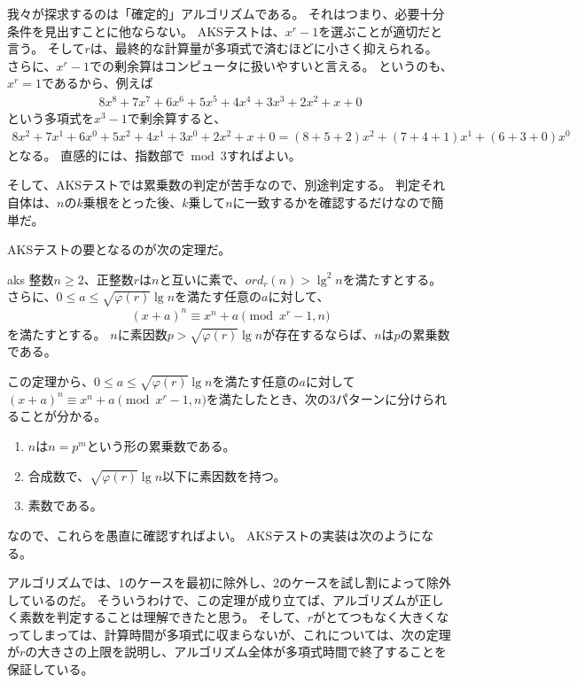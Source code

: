 我々が探求するのは「確定的」アルゴリズムである。
それはつまり、必要十分条件を見出すことに他ならない。
AKSテストは、$x^r-1$を選ぶことが適切だと言う。
そして$r$は、最終的な計算量が多項式で済むほどに小さく抑えられる。
さらに、$x^r-1$での剰余算はコンピュータに扱いやすいと言える。
というのも、$x^r=1$であるから、例えば
\begin{align*}
8x^8 + 7x^7 + 6x^6 + 5x^5 + 4x^4 + 3x^3 + 2x^2 + x + 0
\end{align*}
という多項式を$x^3-1$で剰余算すると、
\begin{align*}
8x^2 + 7x^1 + 6x^0 + 5x^2 + 4x^1 + 3x^0 + 2x^2 + x + 0 = (8 + 5 + 2)x^2 + (7 + 4 + 1)x^1 + (6 + 3 + 0)x^0
\end{align*}
となる。
直感的には、指数部で$\bmod{3}$すればよい。

そして、AKSテストでは累乗数の判定が苦手なので、別途判定する。
判定それ自体は、$n$の$k$乗根をとった後、$k$乗して$n$に一致するかを確認するだけなので簡単だ。

AKSテストの要となるのが次の定理だ。

\begin{Theo}{}{aks}
整数$n\ge2$、正整数$r$は$n$と互いに素で、$ord_r(n)>\lg^2{n}$を満たすとする。
さらに、$0\le a \le\sqrt{\varphi(r)}\lg{n}$を満たす任意の$a$に対して、
\begin{align*}
(x+a)^n \equiv x^n + a \pmod{x^r-1, n}
\end{align*}
を満たすとする。
$n$に素因数$p>\sqrt{\varphi(r)}\lg{n}$が存在するならば、$n$は$p$の累乗数である。
\end{Theo}

この定理から、$0\le a \le\sqrt{\varphi(r)}\lg{n}$を満たす任意の$a$に対して$(x+a)^n \equiv x^n + a \pmod{x^r-1, n}$を満たしたとき、次の3パターンに分けられることが分かる。
\begin{enumerate}
 \item $n$は$n=p^m$という形の累乗数である。
 \item 合成数で、$\sqrt{\varphi(r)}\lg{n}$以下に素因数を持つ。
 \item 素数である。
\end{enumerate}

なので、これらを愚直に確認すればよい。
AKSテストの実装は次のようになる。


アルゴリズムでは、1のケースを最初に除外し、2のケースを試し割によって除外しているのだ。
そういうわけで、この定理が成り立てば、アルゴリズムが正しく素数を判定することは理解できたと思う。
そして、$r$がとてつもなく大きくなってしまっては、計算時間が多項式に収まらないが、これについては、次の定理が$r$の大きさの上限を説明し、アルゴリズム全体が多項式時間で終了することを保証している。

